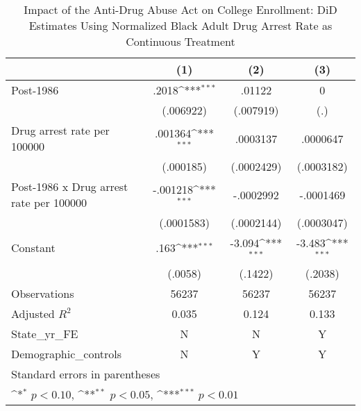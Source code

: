 \begin{table}[htbp]\centering
\def\sym#1{\ifmmode^{#1}\else\(^{#1}\)\fi}
\caption{Impact of the Anti-Drug Abuse Act on College Enrollment: DiD Estimates Using Normalized Black Adult Drug Arrest Rate as Continuous Treatment}
\begin{tabular}{l*{3}{c}}
\hline\hline
                    &\multicolumn{1}{c}{(1)}         &\multicolumn{1}{c}{(2)}         &\multicolumn{1}{c}{(3)}         \\
\hline
Post-1986           &       .2018\sym{***}&      .01122         &           0         \\
                    &   (.006922)         &   (.007919)         &         (.)         \\
[1em]
Drug arrest rate per 100000&     .001364\sym{***}&    .0003137         &    .0000647         \\
                    &   (.000185)         &  (.0002429)         &  (.0003182)         \\
[1em]
Post-1986 x Drug arrest rate per 100000&    -.001218\sym{***}&   -.0002992         &   -.0001469         \\
                    &  (.0001583)         &  (.0002144)         &  (.0003047)         \\
[1em]
Constant            &        .163\sym{***}&      -3.094\sym{***}&      -3.483\sym{***}\\
                    &     (.0058)         &     (.1422)         &     (.2038)         \\
\hline
Observations        &       56237         &       56237         &       56237         \\
Adjusted \(R^{2}\)  &       0.035         &       0.124         &       0.133         \\
State\_yr\_FE         &           N         &           N         &           Y         \\
Demographic\_controls&           N         &           Y         &           Y         \\
\hline\hline
\multicolumn{4}{l}{\footnotesize Standard errors in parentheses}\\
\multicolumn{4}{l}{\footnotesize \sym{*} \(p<0.10\), \sym{**} \(p<0.05\), \sym{***} \(p<0.01\)}\\
\end{tabular}
\end{table}
